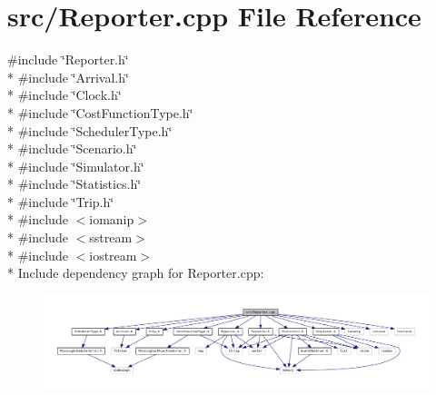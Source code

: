 \section{src/\+Reporter.cpp File Reference}
\label{_reporter_8cpp}
{\ttfamily \#include \char`\"{}Reporter.\+h\char`\"{}}\\*
{\ttfamily \#include \char`\"{}Arrival.\+h\char`\"{}}\\*
{\ttfamily \#include \char`\"{}Clock.\+h\char`\"{}}\\*
{\ttfamily \#include \char`\"{}Cost\+Function\+Type.\+h\char`\"{}}\\*
{\ttfamily \#include \char`\"{}Scheduler\+Type.\+h\char`\"{}}\\*
{\ttfamily \#include \char`\"{}Scenario.\+h\char`\"{}}\\*
{\ttfamily \#include \char`\"{}Simulator.\+h\char`\"{}}\\*
{\ttfamily \#include \char`\"{}Statistics.\+h\char`\"{}}\\*
{\ttfamily \#include \char`\"{}Trip.\+h\char`\"{}}\\*
{\ttfamily \#include $<$iomanip$>$}\\*
{\ttfamily \#include $<$sstream$>$}\\*
{\ttfamily \#include $<$iostream$>$}\\*
Include dependency graph for Reporter.\+cpp\+:\nopagebreak
\begin{figure}[H]
\begin{center}
\leavevmode
\includegraphics[width=350pt]{_reporter_8cpp__incl}
\end{center}
\end{figure}
